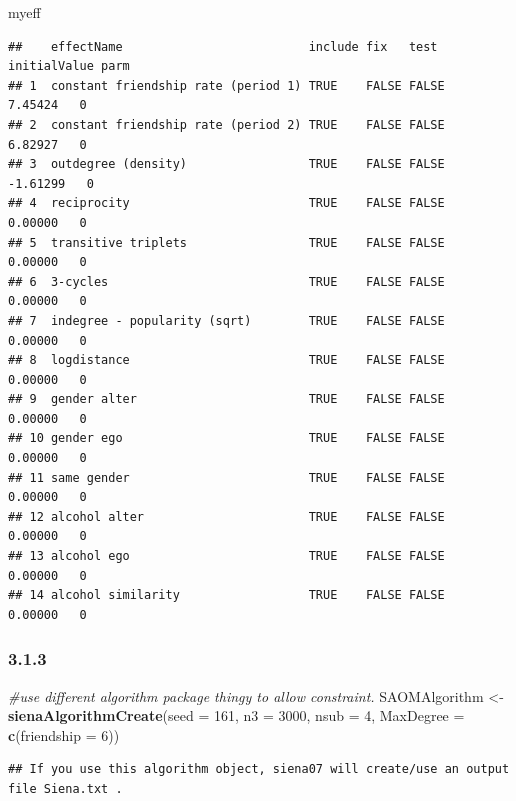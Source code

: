 \documentclass[
]{article}
\newenvironment{Shaded}{\begin{snugshade}}{\end{snugshade}}
\newcommand{\AttributeTok}[1]{\textcolor[rgb]{0.13,0.29,0.53}{#1}}
\newcommand{\CommentTok}[1]{\textcolor[rgb]{0.56,0.35,0.01}{\textit{#1}}}
\newcommand{\DecValTok}[1]{\textcolor[rgb]{0.00,0.00,0.81}{#1}}
\newcommand{\FunctionTok}[1]{\textcolor[rgb]{0.13,0.29,0.53}{\textbf{#1}}}
\newcommand{\NormalTok}[1]{#1}
\newcommand{\OtherTok}[1]{\textcolor[rgb]{0.56,0.35,0.01}{#1}}
\begin{document}
\begin{Shaded}
\begin{Highlighting}[]
\NormalTok{myeff}
\end{Highlighting}
\end{Shaded}

\begin{verbatim}
##    effectName                          include fix   test  initialValue parm
## 1  constant friendship rate (period 1) TRUE    FALSE FALSE    7.45424   0   
## 2  constant friendship rate (period 2) TRUE    FALSE FALSE    6.82927   0   
## 3  outdegree (density)                 TRUE    FALSE FALSE   -1.61299   0   
## 4  reciprocity                         TRUE    FALSE FALSE    0.00000   0   
## 5  transitive triplets                 TRUE    FALSE FALSE    0.00000   0   
## 6  3-cycles                            TRUE    FALSE FALSE    0.00000   0   
## 7  indegree - popularity (sqrt)        TRUE    FALSE FALSE    0.00000   0   
## 8  logdistance                         TRUE    FALSE FALSE    0.00000   0   
## 9  gender alter                        TRUE    FALSE FALSE    0.00000   0   
## 10 gender ego                          TRUE    FALSE FALSE    0.00000   0   
## 11 same gender                         TRUE    FALSE FALSE    0.00000   0   
## 12 alcohol alter                       TRUE    FALSE FALSE    0.00000   0   
## 13 alcohol ego                         TRUE    FALSE FALSE    0.00000   0   
## 14 alcohol similarity                  TRUE    FALSE FALSE    0.00000   0
\end{verbatim}

\subsubsection{3.1.3}\label{section-12}

\begin{Shaded}
\begin{Highlighting}[]
\CommentTok{\#use different algorithm package thingy to allow constraint.}
\NormalTok{SAOMAlgorithm }\OtherTok{\textless{}{-}} \FunctionTok{sienaAlgorithmCreate}\NormalTok{(}\AttributeTok{seed =} \DecValTok{161}\NormalTok{, }\AttributeTok{n3 =} \DecValTok{3000}\NormalTok{, }\AttributeTok{nsub =} \DecValTok{4}\NormalTok{, }\AttributeTok{MaxDegree =} \FunctionTok{c}\NormalTok{(}\AttributeTok{friendship =} \DecValTok{6}\NormalTok{))}
\end{Highlighting}
\end{Shaded}

\begin{verbatim}
## If you use this algorithm object, siena07 will create/use an output file Siena.txt .
\end{verbatim}
\end{document}
